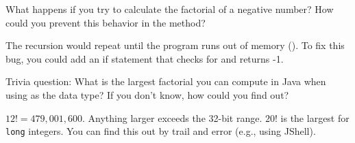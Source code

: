 \Q \label{stackover}
What happens if you try to calculate the factorial of a negative number?
How could you prevent this behavior in the  method?

\begin{answer}
The recursion would repeat until the program runs out of memory ().
To fix this bug, you could add an if statement that checks for  and returns -1.
\end{answer}


\Q Trivia question: What is the largest factorial you can compute in Java when using  as the data type? If you don't know, how could you find out?

\begin{answer}
$12! = 479,001,600$. Anything larger exceeds the 32-bit range. $20!$ is the largest for \texttt{long} integers. You can find this out by trail and error (e.g., using JShell).
\end{answer}
